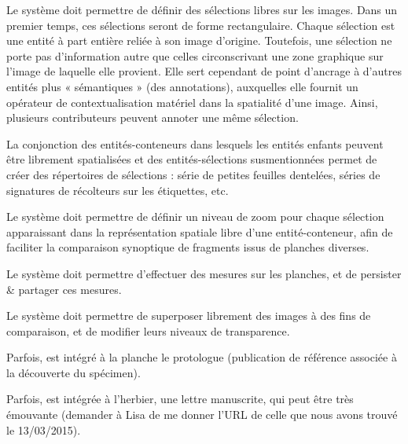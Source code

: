 \startchapter[title={Travail sur les images}]

\exig{}
Le système doit permettre de définir des sélections libres sur les images.
Dans un premier temps, ces sélections seront de forme rectangulaire.
Chaque sélection est une entité à part entière reliée à son image d'origine.
Toutefois, une sélection ne porte pas d'information autre que celles circonscrivant une zone graphique sur l'image de laquelle elle provient.
Elle sert cependant de point d'ancrage à d'autres entités plus « sémantiques » (des annotations), auxquelles elle fournit un opérateur de contextualisation matériel dans la spatialité d'une image.
Ainsi, plusieurs contributeurs peuvent annoter une même sélection.

\idea{}
La conjonction des entités-conteneurs dans lesquels les entités enfants peuvent être librement spatialisées et des entités-sélections susmentionnées permet de créer des répertoires de sélections : série de petites feuilles dentelées, séries de signatures de récolteurs sur les étiquettes, etc.

\exig{}
Le système doit permettre de définir un niveau de zoom pour chaque sélection apparaissant dans la représentation spatiale libre d'une entité-conteneur, afin de faciliter la comparaison synoptique de fragments issus de planches diverses.

\exig{}
Le système doit permettre d'effectuer des mesures sur les planches, et de persister & partager ces mesures.

\exig{}
Le système doit permettre de superposer librement des images à des fins de comparaison, et de modifier leurs niveaux de transparence.

\idea{}
Parfois, est intégré à la planche le protologue (publication de référence associée à la découverte du spécimen).

\idea{}
Parfois, est intégrée à l'herbier, une lettre manuscrite, qui peut être très émouvante (demander à Lisa de me donner l'URL de celle que nous avons trouvé le 13/03/2015).